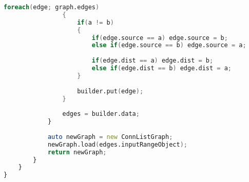 \documentclass[russian,utf8,emptystyle]{eskdtext}
\begin{document}
\begin{lstlisting}[language=D]
                foreach(edge; graph.edges)
                {
                    if(a != b)
                    {
                        if(edge.source == a) edge.source = b;
                        else if(edge.source == b) edge.source = a;
                        
                        if(edge.dist == a) edge.dist = b;
                        else if(edge.dist == b) edge.dist = a;
                    }
                    
                    builder.put(edge);
                }
                
                edges = builder.data;
            }
            
            auto newGraph = new ConnListGraph;
            newGraph.load(edges.inputRangeObject);
            return newGraph;
        }
    }
}
\end{lstlisting}
\end{document}
